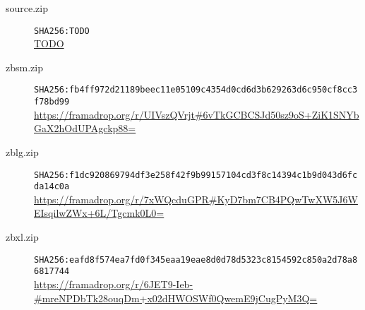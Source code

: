 \documentclass[letterpaper,twocolumn,10pt]{article}
\begin{document}
\begin{description}
\item[source.zip]
{\tiny\texttt{SHA256:TODO}}\\
\url{TODO}
\item[zbsm.zip]
{\tiny\texttt{SHA256:fb4ff972d21189beec11e05109c4354d0cd6d3b629263d6c950cf8cc3f78bd99}}\\
\url{https://framadrop.org/r/UIVszQVrjt#6vTkGCBCSJd50sz9oS+ZiK1SNYbGaX2hOdUPAgckp88=}
\item[zblg.zip]
{\tiny\texttt{SHA256:f1dc920869794df3e258f42f9b99157104cd3f8c14394c1b9d043d6fcda14c0a}}\\
\url{https://framadrop.org/r/7xWQcduGPR#KyD7bm7CB4PQwTwXW5J6WEIsqilwZWx+6L/Tgcmk0L0=}
\item[zbxl.zip]
{\tiny\texttt{SHA256:eafd8f574ea7fd0f345eaa19eae8d0d78d5323c8154592c850a2d78a86817744}}\\
\url{https://framadrop.org/r/6JET9-Ieb-#mreNPDbTk28ouqDm+x02dHWOSWf0QwemE9jCugPyM3Q=}
\end{description}




\end{document}
